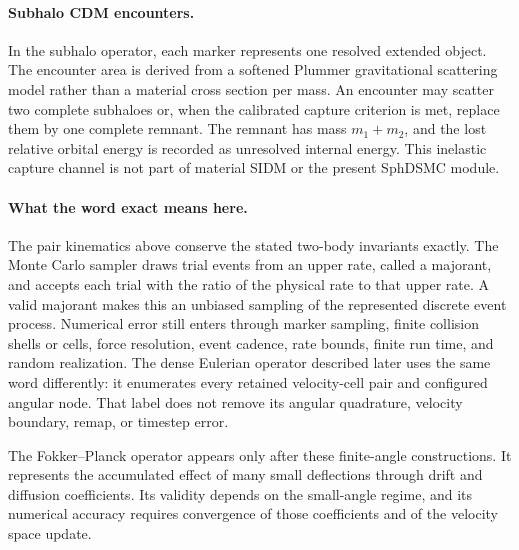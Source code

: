 \paragraph{Subhalo CDM encounters.}
In the subhalo operator, each marker represents one resolved extended
object.  The encounter area is derived from a softened Plummer gravitational
scattering model rather than a material cross section per mass.  An encounter
may scatter two complete subhaloes or, when the calibrated capture criterion
is met, replace them by one complete remnant.  The remnant has mass
\(m_1+m_2\), and the lost relative orbital energy is recorded as unresolved
internal energy.  This inelastic capture channel is not part of material
SIDM or the present SphDSMC module.

\paragraph{What the word exact means here.}
The pair kinematics above conserve the stated two-body invariants exactly.
The Monte Carlo sampler draws trial events from an upper rate, called a
majorant, and accepts each trial with the ratio of the physical rate to that
upper rate. A valid majorant makes this an unbiased sampling of the
represented discrete event process.  Numerical error still enters
through marker sampling, finite collision shells or cells, force resolution,
event cadence, rate bounds, finite run time, and random realization.  The
dense Eulerian operator described later uses the same word differently: it
enumerates every retained velocity-cell pair and configured angular node.
That label does not remove its angular quadrature, velocity boundary, remap,
or timestep error.

The Fokker--Planck operator appears only after these finite-angle constructions.
It represents the accumulated effect of many small deflections through
drift and diffusion coefficients. Its validity depends on the small-angle
regime, and its numerical accuracy requires convergence of those coefficients
and of the velocity space update.
